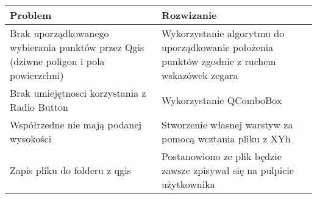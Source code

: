 \begin{table}[h!]
	\centering
	\begin{tabular}{|p{7cm}|p{7cm}|}
		\hline
		\textbf{Problem}  &  \textbf{Rozwizanie} \\
		\hline
		Brak uporządkowanego wybierania punktów przez Qgis (dziwne poligon i pola powierzchni) & Wykorzystanie algorytmu do uporządkowanie położenia punktów zgodnie z ruchem wskazówek zegara   \\ \hline
		Brak umiejętnosci korzystania z Radio Button & Wykorzystanie QComboBox  \\ \hline
		Współrzedne nie mają podanej wysokości & Stworzenie własnej warstyw za pomocą wcztania pliku z XYh \\ \hline
		Zapis pliku do folderu z qgis & Postanowiono ze plik będzie zawsze zpisywał się na pulpicie użytkownika \\ \hline
		
	\end{tabular}
\end{table}
